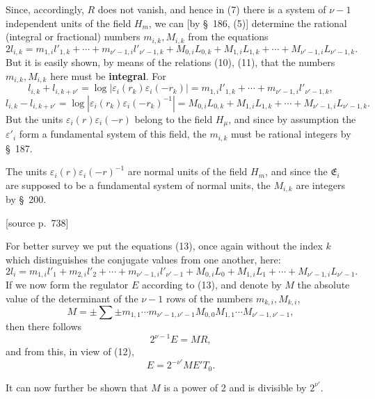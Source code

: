 \documentclass[11pt]{article}
\newcommand{\srcpage}[1]{\par\medskip\noindent\textsf{[source p.~#1]}\par\smallskip}
\begin{document}
Since, accordingly, $R$ does not vanish, and hence in (7) there is a system of $\nu-1$ independent units of the field $H_m$, we can [by \S~186, (5)] determine the rational (integral or fractional) numbers $m_{i,k},M_{i,k}$ from the equations
\begin{equation}
2l_{i,k}=m_{1,i}l'_{1,k}+\cdots+m_{\nu'-1,i}l'_{\nu'-1,k}
+M_{0,i}L_{0,k}+M_{1,i}L_{1,k}+\cdots+M_{\nu'-1,i}L_{\nu'-1,k}.
\tag{13}
\end{equation}
But it is easily shown, by means of the relations (10), (11), that the numbers $m_{i,k},M_{i,k}$ here must be \textbf{integral}. For
\[
l_{i,k}+l_{i,k+\nu'}=\log|\varepsilon_i(r_k)\varepsilon_i(-r_k)|
=m_{1,i}l'_{1,k}+\cdots+m_{\nu'-1,i}l'_{\nu'-1,k},
\]
\[
l_{i,k}-l_{i,k+\nu'}=\log|\varepsilon_i(r_k)\varepsilon_i(-r_k)^{-1}|
=M_{0,i}L_{0,k}+M_{1,i}L_{1,k}+\cdots+M_{\nu'-1,i}L_{\nu'-1,k}.
\]
But the units $\varepsilon_i(r)\varepsilon_i(-r)$ belong to the field $H_\mu$, and since by assumption the $\varepsilon'_i$ form a fundamental system of this field, the $m_{i,k}$ must be rational integers by \S~187.

The units $\varepsilon_i(r)\varepsilon_i(-r)^{-1}$ are normal units of the field $H_m$, and since the $\mathfrak E_i$ are supposed to be a fundamental system of normal units, the $M_{i,k}$ are integers by \S~200.

\srcpage{738}
For better survey we put the equations (13), once again without the index $k$ which distinguishes the conjugate values from one another, here:
\begin{equation}
2l_i=m_{1,i}l'_1+m_{2,i}l'_2+\cdots+m_{\nu'-1,i}l'_{\nu'-1}
+M_{0,i}L_0+M_{1,i}L_1+\cdots+M_{\nu'-1,i}L_{\nu'-1}.
\tag{14}
\end{equation}
If we now form the regulator $E$ according to (13), and denote by $M$ the absolute value of the determinant of the $\nu-1$ rows of the numbers $m_{k,i},M_{k,i}$,
\[
M=\pm\sum\pm m_{1,1}\cdots m_{\nu'-1,\nu'-1}M_{0,0}M_{1,1}\cdots M_{\nu'-1,\nu'-1},
\]
then there follows
\begin{equation}
2^{\nu-1}E=MR,
\tag{15}
\end{equation}
and from this, in view of (12),
\begin{equation}
E=2^{-\nu'}ME'T_0.
\tag{16}
\end{equation}

It can now further be shown that $M$ is a power of 2 and is divisible by $2^{\nu'}$.
\end{document}
